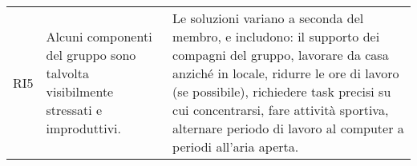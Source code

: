 \begin{longtable}{
		 >{\centering}p{}
		 >{}p{}
		 >{}p{}
	 }
	RI5 &
	Alcuni componenti del gruppo sono talvolta visibilmente stressati e improduttivi. &
	Le soluzioni variano a seconda del membro, e includono: il supporto dei compagni del gruppo, lavorare da casa anziché in locale, ridurre le ore di lavoro (se possibile), richiedere task precisi su cui concentrarsi, fare attività sportiva, alternare periodo di lavoro al computer a periodi all'aria aperta.
	\tabularnewline
	
		
\end{longtable}
